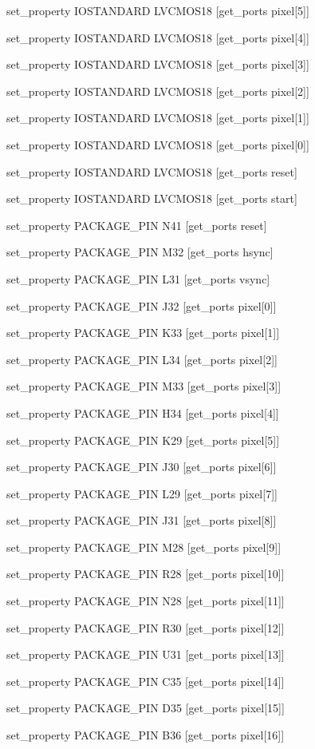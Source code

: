 set\_property IOSTANDARD LVCMOS18 [get\_ports {pixel[5]}]

set\_property IOSTANDARD LVCMOS18 [get\_ports {pixel[4]}]

set\_property IOSTANDARD LVCMOS18 [get\_ports {pixel[3]}]

set\_property IOSTANDARD LVCMOS18 [get\_ports {pixel[2]}]

set\_property IOSTANDARD LVCMOS18 [get\_ports {pixel[1]}]

set\_property IOSTANDARD LVCMOS18 [get\_ports {pixel[0]}]

set\_property IOSTANDARD LVCMOS18 [get\_ports reset]

set\_property IOSTANDARD LVCMOS18 [get\_ports start]

set\_property PACKAGE\_PIN N41 [get\_ports reset]

set\_property PACKAGE\_PIN M32 [get\_ports hsync]

set\_property PACKAGE\_PIN L31 [get\_ports vsync]

set\_property PACKAGE\_PIN J32 [get\_ports {pixel[0]}]

set\_property PACKAGE\_PIN K33 [get\_ports {pixel[1]}]

set\_property PACKAGE\_PIN L34 [get\_ports {pixel[2]}]

set\_property PACKAGE\_PIN M33 [get\_ports {pixel[3]}]

set\_property PACKAGE\_PIN H34 [get\_ports {pixel[4]}]

set\_property PACKAGE\_PIN K29 [get\_ports {pixel[5]}]

set\_property PACKAGE\_PIN J30 [get\_ports {pixel[6]}]

set\_property PACKAGE\_PIN L29 [get\_ports {pixel[7]}]

set\_property PACKAGE\_PIN J31 [get\_ports {pixel[8]}]

set\_property PACKAGE\_PIN M28 [get\_ports {pixel[9]}]

set\_property PACKAGE\_PIN R28 [get\_ports {pixel[10]}]

set\_property PACKAGE\_PIN N28 [get\_ports {pixel[11]}]

set\_property PACKAGE\_PIN R30 [get\_ports {pixel[12]}]

set\_property PACKAGE\_PIN U31 [get\_ports {pixel[13]}]

set\_property PACKAGE\_PIN C35 [get\_ports {pixel[14]}]

set\_property PACKAGE\_PIN D35 [get\_ports {pixel[15]}]

set\_property PACKAGE\_PIN B36 [get\_ports {pixel[16]}]

